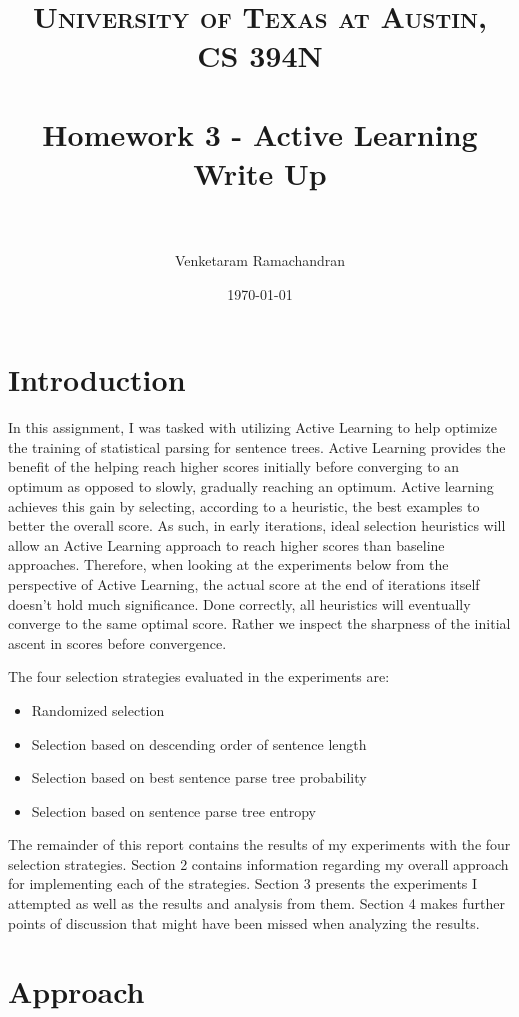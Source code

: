 \documentclass{article} %
\title{	
\normalfont \normalsize 
\textsc{University of Texas at Austin, CS 394N} \\
\horrule{0.6pt} \\[0.4cm] %
\huge Homework 3 - Active Learning \\[0.4cm]
\large Write Up  \\
\horrule{2pt} \\[0.5cm] %
}
\author{Venketaram Ramachandran} %
\date{\normalsize\today} %
\begin{document}
\maketitle %


\section{Introduction}

In this assignment, I was tasked with utilizing Active Learning to help optimize the training of statistical parsing for sentence trees. Active Learning provides the benefit of the helping reach higher scores initially before converging to an optimum as opposed to slowly, gradually reaching an optimum. Active learning achieves this gain by selecting, according to a heuristic, the best examples to better the overall score. As such, in early iterations, ideal selection heuristics will allow an Active Learning approach to reach higher scores than baseline approaches. Therefore, when looking at the experiments below from the perspective of Active Learning, the actual score at the end of iterations itself doesn't hold much significance. Done correctly, all heuristics will eventually converge to the same optimal score. Rather we inspect the sharpness of the initial ascent in scores before convergence.

The four selection strategies evaluated in the experiments are:

\begin{itemize}
\item Randomized selection
\item Selection based on descending order of sentence length
\item Selection based on best sentence parse tree probability
\item Selection based on sentence parse tree entropy
\end{itemize}

The remainder of this report contains the results of my experiments with the four selection strategies.  Section 2 contains information regarding my overall approach for implementing each of the strategies. Section 3 presents the experiments I attempted as well as the results and analysis from them. Section 4 makes further points of discussion that might have been missed when analyzing the results. 

\section{Approach}
\end{document}
